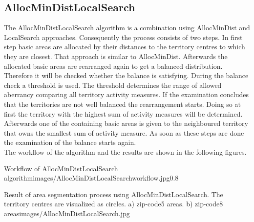 \subsection{AllocMinDistLocalSearch}
The AllocMinDistLocalSearch algorithm is a combination using AllocMinDist and LocalSearch approaches. Consequently the process consists of two steps. In first step basic areas are allocated by their distances to the territory centres to which they are closest. That approach is similar to AllocMinDist. Afterwards the allocated basic areas are rearranged again to get a balanced distribution. Therefore it will be checked whether the balance is satisfying. During the balance check a threshold is used. The threshold determines the range of allowed aberrancy comparing all territory activity measures. If the examination concludes that the territories are not well balanced the rearrangement starts. Doing so at first the territory with the highest sum of activity measures will be determined. Afterwards one of the containing basic areas is given to the neighboured territory that owns the smallest sum of activity measure. As soon as these steps are done the examination of the balance starts again.\\
The workflow of the algorithm and the results are shown in the following figures.

\begin{figurevarSize}{Workflow of AllocMinDistLocalSearch algorithm}{images/AllocMinDistLocalSearchworkflow.jpg}{0.8}\end{figurevarSize}


\begin{figureOwn}{Result of area segmentation process using AllocMinDistLocalSearch. The territory centres are visualized as circles. a) zip-code5 areas. b) zip-code8 areas}{images/AllocMinDistLocalSearch.jpg}\end{figureOwn}



